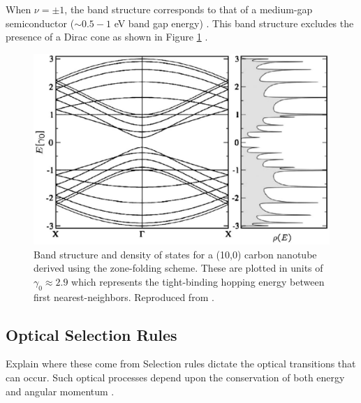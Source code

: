 When $\nu= \pm 1$, the band structure corresponds to that of a medium-gap semiconductor ($\sim0.5 - 1$ eV band gap energy) \cite{nanot2012optoelectronic}. This band structure excludes the presence of a Dirac cone as shown in Figure \ref{fig:ten_zero_cnt}  \cite{charlier2007electronic}.



\begin{figure}[ht]
	\centering
	\includegraphics[scale=0.38]{images/chapter_optical_props/ten_zero_band_charlier}
	\caption{Band structure and density of states for a (10,0) carbon nanotube derived using the zone-folding scheme. These are plotted in units of $\gamma_0 \approx 2.9$ which represents the tight-binding hopping energy between first nearest-neighbors. Reproduced from \cite{charlier2007electronic}.}
	\label{fig:ten_zero_cnt}
\end{figure}


\subsection{Optical Selection Rules}
\label{section:selection_rules}
{\color{red} Explain where these come from}
Selection rules dictate the optical transitions that can occur. Such optical processes depend upon the conservation of both energy and angular momentum \cite{weismanKonoBook}.

